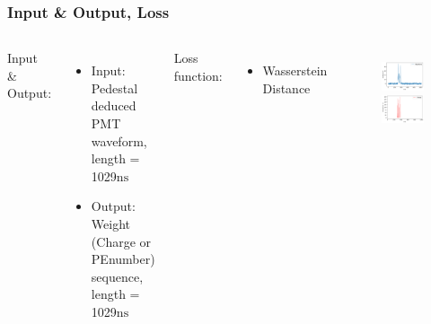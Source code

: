 \documentclass{beamer}
\begin{document}
\begin{frame}
\frametitle{Input \& Output, Loss}
\begin{columns}
\hspace{4mm}Input \& Output:
\begin{itemize}
    \item Input: Pedestal deduced PMT waveform, length = 1029$\mathrm{ns}$
    \item Output: Weight (Charge or PEnumber) sequence, length = 1029$\mathrm{ns}$
\end{itemize}
\hspace{4mm}Loss function:
\begin{itemize}
    \item Wasserstein Distance
\end{itemize}
\setlength{\abovecaptionskip}{-2mm}
\setlength{\belowcaptionskip}{0mm}
\begin{figure}
    \centering
    \includegraphics[width=0.9\linewidth]{img/wave.png}
    \includegraphics[width=0.9\linewidth]{img/charge.png}
\end{figure}
\end{columns}
\end{frame}
\end{document}
